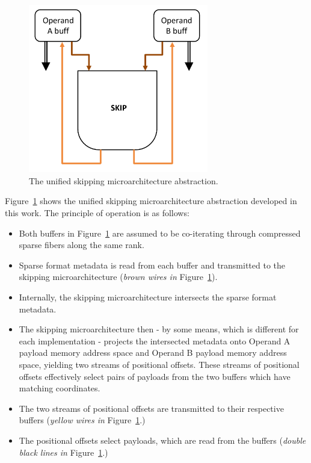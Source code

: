 \begin{figure}[ht]
    \centering
    \includegraphics[width=0.7\textwidth]{figures/uniform_skip_topo.pdf}
    \caption{The unified skipping microarchitecture abstraction.}
    \label{fig:uniform_skip_topo}
\end{figure}

Figure~\ref{fig:uniform_skip_topo} shows the unified skipping microarchitecture abstraction developed in this work. The principle of operation is as follows:

\begin{itemize}
    \item Both buffers in Figure~\ref{fig:uniform_skip_topo} are assumed to be co-iterating through compressed sparse fibers along the same rank.
    \item Sparse format metadata is read from each buffer and transmitted to the skipping microarchitecture (\textit{brown wires in} Figure~\ref{fig:uniform_skip_topo}).
    \item Internally, the skipping microarchitecture intersects the sparse format metadata. 
    \item The skipping microarchitecture then - by some means, which is different for each implementation - projects the intersected metadata onto Operand A payload memory address space and Operand B payload memory address space, yielding two streams of positional offsets. These streams of positional offsets effectively select pairs of payloads from the two buffers which have matching coordinates.
    \item The two streams of positional offsets are transmitted to their respective buffers (\textit{yellow wires in} Figure~\ref{fig:uniform_skip_topo}.)
    \item The positional offsets select payloads, which are read from the buffers (\textit{double black lines in} Figure~\ref{fig:uniform_skip_topo}.)
\end{itemize}

